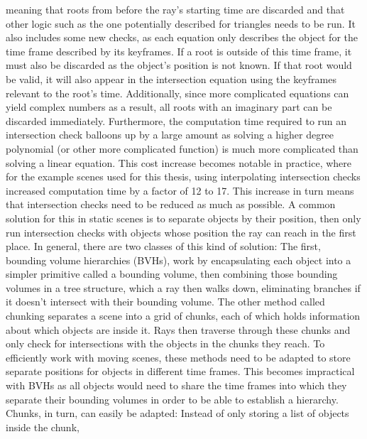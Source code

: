 meaning that roots from before the ray's starting time are discarded
and that other logic such as the one potentially described for triangles needs to be run.
It also includes some new checks,
as each equation only describes the object for the time frame described by its keyframes.
If a root is outside of this time frame,
it must also be discarded as the object's position is not known.
If that root would be valid,
it will also appear in the intersection equation using the keyframes relevant to the root's time.
Additionally, since more complicated equations can yield complex numbers as a result,
all roots with an imaginary part can be discarded immediately.
\newline
Furthermore, the computation time required to run an intersection check
balloons up by a large amount as solving a higher degree polynomial (or other more complicated function)
is much more complicated than solving a linear equation.
This cost increase becomes notable in practice, where for the example scenes used for this thesis,
using interpolating intersection checks increased computation time by a factor of 12 to 17.
\newline
This increase in turn means that intersection checks need to be reduced as much as possible.
A common solution for this in static scenes is to separate objects by their position,
then only run intersection checks with objects whose position the ray can reach in the first place.
\newline
In general, there are two classes of this kind of solution:
The first, bounding volume hierarchies (BVHs), work by encapsulating each object into a simpler primitive called a bounding volume,
then combining those bounding volumes in a tree structure,
which a ray then walks down, eliminating branches if it doesn't intersect with their bounding volume.
The other method called chunking separates a scene into a grid of chunks,
each of which holds information about which objects are inside it.
Rays then traverse through these chunks and only check for intersections with the objects in the chunks they reach.
\newline
To efficiently work with moving scenes,
these methods need to be adapted to store separate positions for objects in different time frames.
This becomes impractical with BVHs as all objects would need to share the time frames
into which they separate their bounding volumes in order to be able to establish a hierarchy.
\newline
Chunks, in turn, can easily be adapted:
Instead of only storing a list of objects inside the chunk,
